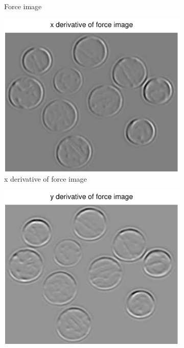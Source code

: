 \documentclass[11pt,a4paper]{article}
\begin{document}
\begin{figure}[H]
\begin{subfigure}[t]{0.21\textwidth}
        \caption{Force image}
        \label{fig:coins_log_forces}
    \end{subfigure}
    \begin{subfigure}[t]{0.21\textwidth}
        \includegraphics[width=\textwidth]{src/images/coins_log_xforces.pdf}
        \caption{x derivative of force image}
        \label{fig:coins_log_fx}
    \end{subfigure}
    \begin{subfigure}[t]{0.21\textwidth}
        \includegraphics[width=\textwidth]{src/images/coins_log_yforces.pdf}

\end{subfigure}
\end{figure}
\end{document}
